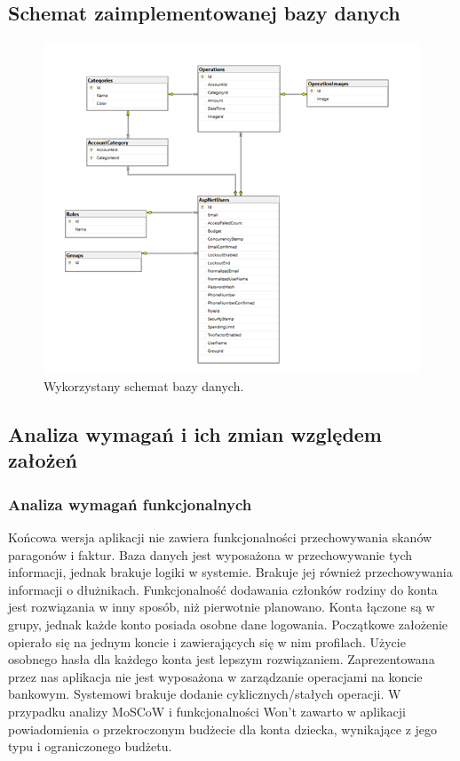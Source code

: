 \documentclass[12pt,a4paper,oneside]{article}
\begin{document}
\subsection{Schemat zaimplementowanej bazy danych}
\begin{figure}[H]
    \centering
    \includegraphics[width=\hsize,keepaspectratio]{images/DB2.png}
    \caption{Wykorzystany schemat bazy danych.}
\end{figure}

\subsection{Analiza wymagań i ich zmian względem założeń}
\subsubsection{Analiza wymagań funkcjonalnych}
Końcowa wersja aplikacji nie zawiera funkcjonalności przechowywania skanów
paragonów i faktur. Baza danych jest wyposażona w przechowywanie tych informacji,
jednak brakuje logiki w systemie. Brakuje jej również przechowywania informacji 
o dłużnikach. Funkcjonalność dodawania członków rodziny do konta jest rozwiązania 
w inny sposób, niż pierwotnie planowano. Konta łączone są w grupy, jednak każde
konto posiada osobne dane logowania. Początkowe założenie opierało się na jednym
koncie i zawierających się w nim profilach. Użycie osobnego hasła dla każdego
konta jest lepszym rozwiązaniem. Zaprezentowana przez nas aplikacja nie jest 
wyposażona w zarządzanie operacjami na koncie bankowym. Systemowi brakuje
dodanie cyklicznych/stałych operacji. W przypadku analizy MoSCoW i 
funkcjonalności Won't zawarto w aplikacji powiadomienia o przekroczonym budżecie 
dla konta dziecka, wynikające z jego typu i ograniczonego budżetu.
\end{document}
